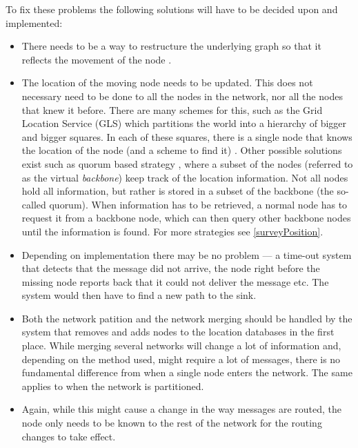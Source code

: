To fix these problems the following solutions will have to be decided upon and implemented:
\begin{itemize}
\item There needs to be a way to restructure the underlying graph so that it reflects the movement of the node \cite{practical}.
\item The location of the moving node needs to be updated. This does not necessary need to be done to all the nodes in the network, nor all the nodes that knew it before. There are many schemes for this, such as the Grid Location Service (GLS) \cite{scaleLocation} which partitions the world into a hierarchy of bigger and bigger squares. In each of these squares, there is a single node that knows the location of the node (and a scheme to find it) \cite{scaleLocation}. Other possible solutions exist such as quorum based strategy \cite{quorum_basic}, where a subset of the nodes (referred to as the virtual \emph{backbone}) keep track of the location information. Not all nodes hold all information, but rather is stored in a subset of the backbone (the so-called quorum). When information has to be retrieved, a normal node has to request it from a backbone node, which can then query other backbone nodes until the information is found. For more strategies see \ref{surveyPosition}.
\item Depending on implementation there may be no problem --- a time-out system that detects that the message did not arrive, the node right before the missing node reports back that it could not deliver the message etc. The system would then have to find a new path to the sink.
\item Both the network patition and the network merging should be handled by the system that removes and adds nodes to the location databases in the first place. While merging several networks will change a lot of information and, depending on the method used, might require a lot of messages, there is no fundamental difference from when a single node enters the network. The same applies to when the network is partitioned. 
\item Again, while this might cause a change in the way messages are routed, the node only needs to be known to the rest of the network for the routing changes to take effect. 
\end{itemize}
